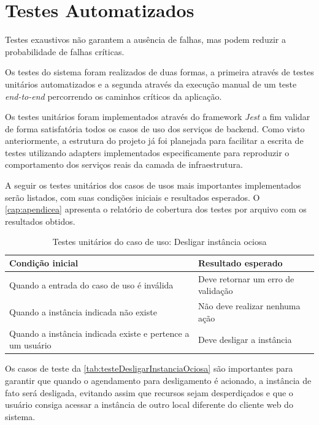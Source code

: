\section{Testes Automatizados}
\label{sec:testesAutomatizados}

Testes exaustivos não garantem a ausência de falhas, mas podem reduzir a probabilidade de falhas críticas. \citep{pressman2016}

Os testes do sistema foram realizados de duas formas, a primeira através de testes unitários automatizados e a segunda através da execução manual de um teste \textit{end-to-end} percorrendo os caminhos críticos da aplicação.

Os testes unitários foram implementados através do framework \textit{Jest} a fim validar de forma satisfatória todos os casos de uso dos serviços de backend. Como visto anteriormente, a estrutura do projeto já foi planejada para facilitar a escrita de testes utilizando \glspl{adapter} implementados especificamente para reproduzir o comportamento dos serviços reais da camada de infraestrutura.

A seguir os testes unitários dos casos de usos mais importantes implementados serão listados, com suas condições iniciais e resultados esperados. O \autoref{cap:apendicea} apresenta o relatório de cobertura dos testes por arquivo com os resultados obtidos.

\begin{table}[h]
\caption{Testes unitários do caso de uso: Desligar instância ociosa}
\label{tab:testeDesligarInstanciaOciosa}
\begin{tabularx}{\textwidth}{p{} p{}}
\toprule
\textbf{Condição inicial} & \textbf{Resultado esperado} \\ \midrule

Quando a entrada do caso de uso é inválida & Deve retornar um erro de validação \\ \hline

Quando a instância indicada não existe & Não deve realizar nenhuma ação \\ \hline

Quando a instância indicada existe e pertence a um usuário & Deve desligar a instância \\ 

\bottomrule
\end{tabularx}
\end{table}

Os casos de teste da \autoref{tab:testeDesligarInstanciaOciosa} são importantes para garantir que quando o agendamento para desligamento é acionado, a instância de fato será desligada, evitando assim que recursos sejam desperdiçados e que o usuário consiga acessar a instância de outro local diferente do cliente web do sistema.


